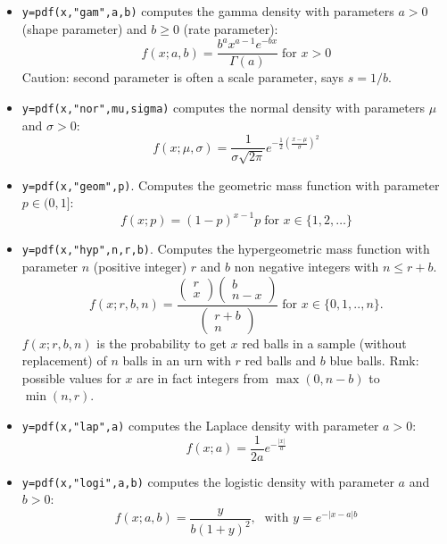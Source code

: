 \begin{mandescription}
\begin{itemize}
\item {} \verb!y=pdf(x,"gam",a,b)! computes the gamma
  density with parameters $a > 0$ (shape parameter) and $b \ge 0$
  (rate parameter):
$$
     f(x; a, b) = \frac{ b^a x^{a-1} e^{-bx} } {\Gamma(a)}\; \mbox{for } x > 0
$$
Caution: second parameter is often a scale parameter, says $s = 1/b$.

\item {} \verb!y=pdf(x,"nor",mu,sigma)! computes the normal
  density with parameters $\mu$ and $\sigma > 0$:
$$
     f(x; \mu, \sigma) = \frac{ 1 }{ \sigma \sqrt{2\pi}}
     e^{-\frac{1}{2} \left( \frac{x-\mu}{\sigma} \right)^2 }
$$


\item {} \verb!y=pdf(x,"geom",p)!. Computes
  the geometric mass function with parameter $p \in (0,1]$:
$$
     f(x; p) = (1-p)^{x-1} p \;\mbox{for } x \in \{1, 2, \dots\}
$$

\item {} \verb!y=pdf(x,"hyp",n,r,b)!. Computes
  the hypergeometric mass function with parameter $n$ (positive
  integer) $r$ and $b$ non negative integers with $n \le r + b$. 
$$
     f(x; r,b,n) = 
    \frac{\left(\begin{array}{c}r\\x\end{array}\right)
          \left(\begin{array}{c}b\\n-x\end{array}\right)}
         {\left(\begin{array}{c}r+b\\n\end{array}\right)}
         \;\mbox{for } x \in \{0, 1, .., n\}.
$$
$f(x; r,b,n)$ is the probability to get $x$ red balls
in a sample (without replacement) of $n$ balls in an urn
with $r$ red balls and $b$ blue balls. Rmk: possible values
for $x$ are in fact integers from  $\max(0,n-b)$ to $\min(n,r)$.


\item {} \verb!y=pdf(x,"lap",a)! computes the Laplace
  density with parameter $a > 0$:
$$
     f(x; a) = \frac{1}{2a} e^{-\frac{|x|}{a}}
$$

\item {} \verb!y=pdf(x,"logi",a,b)! computes the logistic
  density with parameter $a$ and $b > 0$:
$$
     f(x; a,b) = \frac{y}{b (1+y)^2}, \; \mbox{ with } y = e^{-{|x-a|}{b}}
$$



\end{itemize}
\end{mandescription}
